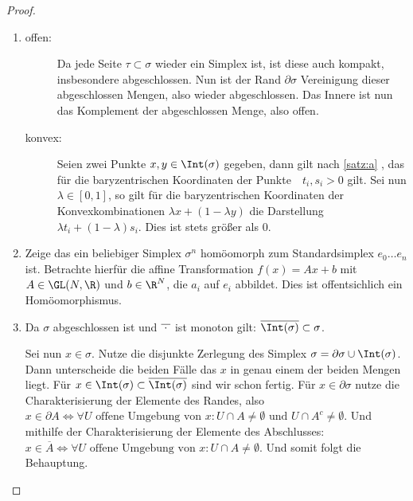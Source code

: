 \begin{Satz}
\begin{proof}
\begin{enumerate}[$a)$:]
   \item \begin{description}
     \item[offen:] Da jede Seite $\tau \subset \sigma$ wieder ein
       Simplex ist, ist diese auch kompakt, insbesondere
       abgeschlossen. Nun ist der Rand $\partial\sigma$ Vereinigung
       dieser abgeschlossen Mengen, also wieder abgeschlossen. Das
       Innere ist nun das Komplement der abgeschlossen Menge, also
       offen.
     \item[konvex:] Seien zwei Punkte $x,y \in \Int(\sigma)$ gegeben,
       dann
       gilt nach \cref{satz:a} , das für die baryzentrischen
       Koordinaten der Punkte~~$t_i,s_i >0$ gilt. Sei nun
       $\lambda \in [0,1]$, so gilt für die baryzentrischen
       Koordinaten der Konvexkombinationen $\lambda x + (1-\lambda y)$
       die Darstellung $\lambda t_i + (1-\lambda)s_i$. Dies ist stets
       größer als $0$.
        \end{description}
      \item Zeige das ein beliebiger Simplex $\sigma^n$ homöomorph zum
        Standardsimplex $e_0\ldots e_n$ ist. Betrachte hierfür die
        affine Transformation $f(x) = Ax+b$ mit $A \in \GL(N,\R)$ und
        $b \in \R^N$, die $a_i$ auf $e_i$ abbildet. Dies ist
        offentsichlich ein Homöomorphismus.
      \item Da $\sigma$ abgeschlossen ist und
        $\overline{\hspace{0.1cm} \cdot \hspace{0.1cm}}$ ist monoton
        gilt: $\overline{\Int(\sigma)} \subset \sigma$.

        Sei nun $x \in \sigma$. Nutze die disjunkte Zerlegung des
        Simplex $\sigma = \partial\sigma \cup \Int(\sigma)$. Dann
        unterscheide die beiden Fälle das $x$ in genau einem der
        beiden Mengen liegt. Für
        $x \in \Int(\sigma) \subset \overline{\Int(\sigma)}$ sind wir
        schon fertig. Für $x \in \partial\sigma$ nutze die
        Charakterisierung der Elemente des Randes, also
        $x \in \partial A \Leftrightarrow \forall U \text{ offene
          Umgebung von } x : U \cap A \not= \emptyset \text{ und } U
        \cap A^c \not= \emptyset $.
        Und mithilfe der Charakterisierung der Elemente des
        Abschlusses:
        $ x \in \overline{A} \Leftrightarrow \forall U \text{ offene
          Umgebung von }x : U \cap A \not= \emptyset$.
        Und somit folgt die Behauptung.


\end{enumerate}
\end{proof}
\end{Satz}
